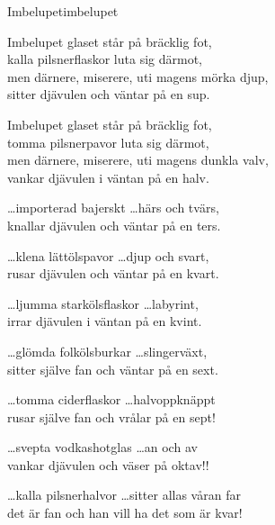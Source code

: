 \begin{song}{Imbelupet}{imbelupet}
  \begin{vers}
    Imbelupet glaset står på bräcklig fot,\\
    kalla pilsnerflaskor luta sig därmot,\\
    men därnere, miserere, uti magens mörka djup,\\
    sitter djävulen och väntar på en sup.\\
  \end{vers}
  \begin{vers}
    Imbelupet glaset står på bräcklig fot,\\
    tomma pilsnerpavor luta sig därmot,\\
    men därnere, miserere, uti magens dunkla valv,\\
    vankar djävulen i väntan på en halv.\\
  \end{vers}
  \begin{vers}
    \ldots importerad bajerskt \ldots härs och tvärs,\\
    knallar djävulen och väntar på en ters.\\
  \end{vers}
  \begin{vers}
    \ldots klena lättölspavor \ldots djup och svart,\\
    rusar djävulen och väntar på en kvart.\\
  \end{vers}
  \begin{vers}
    \ldots ljumma starkölsflaskor \ldots labyrint,\\
    irrar djävulen i väntan på en kvint.\\
  \end{vers}
  \begin{vers}
    \ldots glömda folkölsburkar \ldots slingerväxt,\\
    sitter själve fan och väntar på en sext.\\
  \end{vers}
  \begin{vers}
    \ldots tomma ciderflaskor \ldots halvoppknäppt\\
    rusar själve fan och vrålar på en sept!\\
  \end{vers}
  \begin{vers}
    \ldots svepta vodkashotglas \ldots an och av\\
    vankar djävulen och väser på oktav!!\\
  \end{vers}
  \begin{vers}
    \ldots kalla pilsnerhalvor \ldots sitter allas våran far\\
    det är fan och han vill ha det som är kvar!\\
  \end{vers}
\end{song}